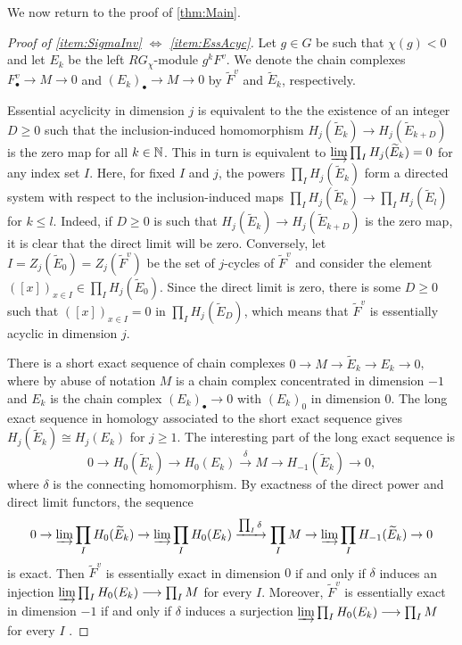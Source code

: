 \documentclass[11pt, letterpaper]{amsart}
\begin{document}
We now return to the proof of \cref{thm:Main}.

\begin{proof}[Proof of \ref{item:SigmaInv} $\Longleftrightarrow$ \ref{item:EssAcyc}] Let $g \in G$ be such that $\chi(g) < 0$ and let $E_k$ be the left $RG_\chi$-module $g^k F^v$. We denote the chain complexes $F^v_\bullet \longrightarrow M \longrightarrow 0$ and $(E_k)_\bullet \longrightarrow M \longrightarrow 0$ by $\widetilde{F}^v$ and $\widetilde{E}_k$, respectively.

Essential acyclicity in dimension $j$ is equivalent to the the existence of an integer $D \geqslant 0$ such that the inclusion-induced homomorphism $H_j(\widetilde{E}_k) \longrightarrow H_j(\widetilde{E}_{k+D})$ is the zero map for all $k \in \mathbb{N}$. This in turn is equivalent to $\varinjlim \prod_{I} H_j(\widetilde{E}_k) = 0$ for any index set $I$. Here, for fixed $I$ and $j$, the powers $\prod_{I} H_j(\widetilde{E}_k)$ form a directed system with respect to the inclusion-induced maps $\prod_I H_j(\widetilde{E}_k) \longrightarrow \prod_I H_j(\widetilde{E}_l)$ for $k \leqslant l$. Indeed, if $D \geqslant 0$ is such that $H_j(\widetilde{E}_k) \longrightarrow H_j(\widetilde{E}_{k+D})$ is the zero map, it is clear that the direct limit will be zero. Conversely, let $I = Z_j(\widetilde{E}_0) = Z_j(\widetilde{F}^v)$ be the set of $j$-cycles of $\widetilde{F}^v$ and consider the element $([x])_{x \in I} \in \prod_I H_j(\widetilde{E}_0)$. Since the direct limit is zero, there is some $D \geqslant 0$ such that $([x])_{x \in I} = 0$ in $\prod_I H_j(\widetilde{E}_D)$, which means that $\widetilde{F}^v$ is essentially acyclic in dimension $j$.

There is a short exact sequence of chain complexes $0 \longrightarrow M \longrightarrow \widetilde{E}_k \longrightarrow E_k \longrightarrow 0$, where by abuse of notation $M$ is a chain complex concentrated in dimension $-1$ and $E_k$ is the chain complex $(E_k)_\bullet \longrightarrow 0$ with $(E_k)_0$ in dimension $0$. The long exact sequence in homology associated to the short exact sequence gives $H_j(\widetilde{E}_k) \cong H_j(E_k)$ for $j \geqslant 1$. The interesting part of the long exact sequence is
\[
0 \longrightarrow H_0(\widetilde{E}_k) \longrightarrow H_0(E_k) \xrightarrow{\delta} M \longrightarrow H_{-1}(\widetilde{E}_k) \longrightarrow 0,
\]
where $\delta$ is the connecting homomorphism. By exactness of the direct power and direct limit functors, the sequence
\[
0 \rightarrow \varinjlim \prod_I H_0(\widetilde{E}_k) \rightarrow \varinjlim \prod_I H_0(E_k) \xrightarrow{\prod_I \delta} \prod_I M \rightarrow \varinjlim \prod_I H_{-1}(\widetilde{E}_k) \rightarrow 0
\]
is exact. Then $\widetilde{F}^v$ is essentially exact in dimension $0$ if and only if $\delta$ induces an injection $\varinjlim \prod_I H_0(E_k) \longrightarrow \prod_I M$ for every $I$. Moreover, $\widetilde{F}^v$ is essentially exact in dimension $-1$ if and only if $\delta$ induces a surjection $\varinjlim \prod_I H_0(E_k) \longrightarrow \prod_I M$ for every $I$ .


\end{proof}
\end{document}
